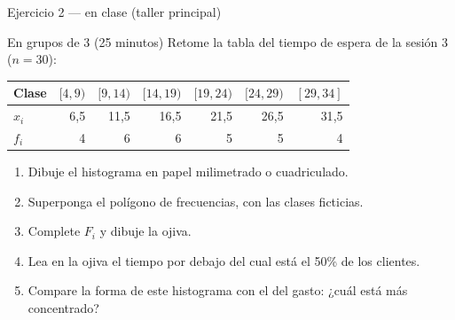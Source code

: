 \documentclass[aspectratio=169,10pt]{beamer}
\begin{document}
\begin{frame}{Ejercicio 2 — en clase (taller principal)}
  \begin{alertblock}{En grupos de 3 (25 minutos)}
    \scriptsize
    Retome la tabla del tiempo de espera de la sesión 3 ($n=30$):

    \vspace{0.1cm}
    \centering\scriptsize
    \begin{tabular}{@{}lrrrrrr@{}}
      \toprule
      \textbf{Clase} & $[4,9)$ & $[9,14)$ & $[14,19)$ & $[19,24)$ & $[24,29)$ &
      $[29,34]$ \\
      \midrule
      $x_i$ & 6{,}5 & 11{,}5 & 16{,}5 & 21{,}5 & 26{,}5 & 31{,}5 \\
      $f_i$ & 4 & 6 & 6 & 5 & 5 & 4 \\
      \bottomrule
    \end{tabular}

    \vspace{0.15cm}
    \raggedright
    \begin{enumerate}\setlength{\itemsep}{-0.1cm}
      \item Dibuje el histograma en papel milimetrado o cuadriculado.
      \item Superponga el polígono de frecuencias, con las clases ficticias.
      \item Complete $F_i$ y dibuje la ojiva.
      \item Lea en la ojiva el tiempo por debajo del cual está el 50\% de los
            clientes.
      \item Compare la forma de este histograma con el del gasto: ¿cuál está
            más concentrado?
    \end{enumerate}
  \end{alertblock}
\end{frame}
\end{document}
